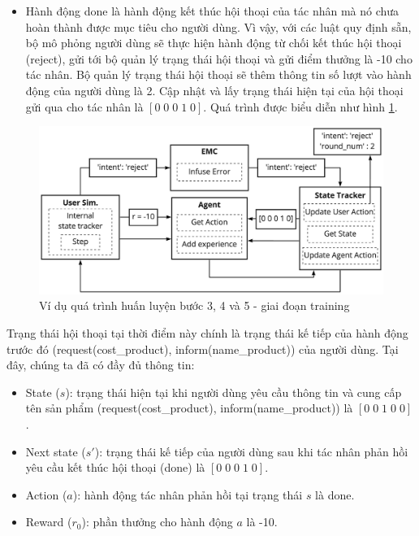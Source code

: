 \begin{itemize}
    \item Hành động done là hành động kết thúc hội thoại của tác nhân mà nó chưa hoàn thành được mục tiêu cho người dùng. Vì vậy, với các luật quy định sẵn, bộ mô phỏng người dùng sẽ thực hiện hành động từ chối kết thúc hội thoại (reject), gửi tới bộ quản lý trạng thái hội thoại và gửi điểm thưởng là -10 cho tác nhân. Bộ quản lý trạng thái hội thoại sẽ thêm thông tin số lượt vào hành động của người dùng là 2. Cập nhật và lấy trạng thái hiện tại của hội thoại gửi qua cho tác nhân là $[0\; 0\; 0\; 1\; 0]$. Quá trình được biểu diễn như hình \ref{fig:examtraining2}.
\end{itemize}

\begin{center}
    \begin{figure}[h!]
        \begin{center}
         \includegraphics[scale=0.15]{chapter4/img/training_exam2.jpg}
        \end{center}
        \caption{Ví dụ quá trình huấn luyện bước 3, 4 và 5 - giai đoạn training}
        \label{fig:examtraining2}
    \end{figure}
\end{center}

Trạng thái hội thoại tại thời điểm này chính là trạng thái kế tiếp của hành động trước đó (request(cost\_product), inform(name\_product)) của người dùng.
Tại đây, chúng ta đã có đầy đủ thông tin:
\begin{itemize}
    \item State ($s$): trạng thái hiện tại khi người dùng yêu cầu thông tin và cung cấp tên sản phẩm (request(cost\_product), inform(name\_product)) là $[0\; 0\; 1\; 0\; 0]$.
    \item Next state ($s'$): trạng thái kế tiếp của người dùng sau khi tác nhân phản hồi yêu cầu kết thúc hội thoại (done) là $[0\; 0\; 0\; 1\; 0]$.
    \item Action ($a$): hành động tác nhân phản hồi tại trạng thái $s$ là done.
    \item Reward ($r_0$): phần thưởng cho hành động $a$ là -10.
\end{itemize}

